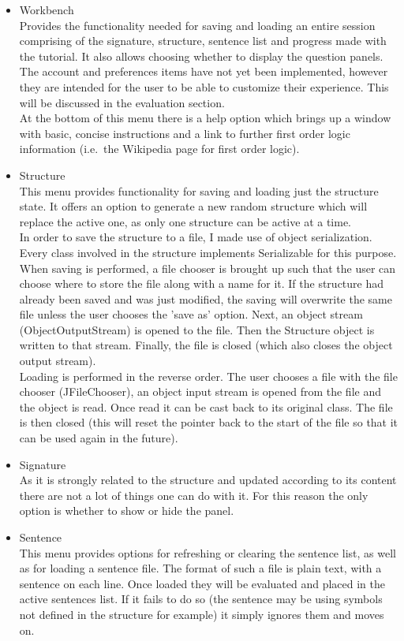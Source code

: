 \documentclass{report}
\begin{document}
\begin{itemize}
\item Workbench \\
Provides the functionality needed for saving and loading an entire session 
comprising of the signature, structure, sentence list and progress made with the 
tutorial. It also allows choosing whether to display the question panels.\\
The account and preferences items have not yet been implemented, however they 
are intended for the user to be able to customize their experience. This will 
be discussed in the evaluation section. \\
At the bottom of this menu there is a help option which brings up a window with 
basic, concise instructions and a link to further first order logic information 
(i.e.\ the Wikipedia page for first order logic).

\item Structure \\
This menu provides functionality for saving and loading just the structure 
state. It offers an option to generate a new random structure which will replace 
the active one, as only one structure can be active at a time. \\
In order to save the structure to a file, I made use of object serialization. 
Every class involved in the structure implements Serializable for this purpose. 
When saving is performed, a file chooser is brought up such that the user can 
choose where to store the file along with a name for it. If the structure had 
already been saved and was just modified, the saving will overwrite the same 
file unless the user chooses the 'save as' option. Next, an object stream 
(ObjectOutputStream) is opened to the file. Then the Structure object is written 
to that stream. Finally, the file is closed (which also closes the object output 
stream). \\
Loading is performed in the reverse order. The user chooses a file with the file
chooser (JFileChooser), an object input stream is opened from the file and the
object is read. Once read it can be cast back to its original class. The file is
then closed (this will reset the pointer back to the start of the file so that
it can be used again in the future).

\item Signature \\
As it is strongly related to the structure and updated according to its content 
there are not a lot of things one can do with it. For this reason the only 
option is whether to show or hide the panel.
\item Sentence \\
This menu provides options for refreshing or clearing the sentence list, as well 
as for loading a sentence file. The format of such a file is plain text, with a 
sentence on each line. Once loaded they will be evaluated and placed in the 
active sentences list. If it fails to do so (the sentence may be using symbols
not defined in the structure for example) it simply ignores them and moves on.
\end{itemize}
\end{document}
